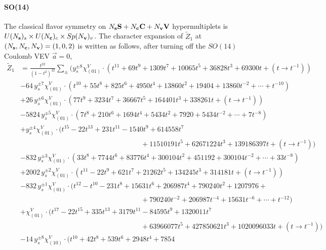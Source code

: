 \documentclass[letterpaper, 11pt]{article}
\newcommand{\nn}{\nonumber}
\begin{document}
{  \paragraph{SO(14)} The classical flavor symmetry  on $N_{\bf s} \mathbf{S}+N_{\bf c} \mathbf{C}+ N_{\bf v} \mathbf{V}$ hypermultiplets is $U(N_{\bf s})_s \times U(N_{\bf c})_c  \times Sp(N_{\bf v})_v$. The character expansion of  $\tilde{Z}_1$ at $(N_{\bf s},N_{\bf c}, N_{\bf v}) = (1,0,2)$ is written as follows, after turning off the $SO(14)$ Coulomb VEV $\vec{a} = 0$,
  \begin{align}
  \label{eq:so14-s1v2}
  \tilde{Z}_1&=\frac{t^{22}}{(1-t^2)^{22}}\sum_{\pm}\Big(y_s^{\pm8}\chi^V_{(01)}\cdot (t^{11}+69 t^9+1309 t^7+10065 t^5+36828 t^3+69300
  t+  (t\rightarrow t^{-1}) )\nn\\
  &-64\,y_s^{\pm7}\chi^V_{(01)}\cdot (t^{10}+55 t^8+825 t^6+4950 t^4+13860
  t^2+19404+13860t^{-2} + \cdots + t^{-10})\nn\\
  &+26\,y_s^{\pm6}\chi^V_{(01)}\cdot (77 t^9+3234 t^7+36667 t^5+164401 t^3+338261
  t+  (t\rightarrow t^{-1}))\nn\\
  &-5824\,y_s^{\pm5}\chi^V_{(01)}\cdot (7 t^8+210 t^6+1694 t^4+5434
  t^2+7920+ 5434t^{-2} + \cdots + 7t^{-8}) \nn\\
  &+y_s^{\pm4}\chi^V_{(01)}\cdot (t^{15}-22 t^{13}+231 t^{11}-1540 t^9+614558 t^7\nn\\
  &\qquad\qquad\qquad\qquad\qquad\qquad\qquad\qquad\quad +11510191 t^5+62671224 t^3+139186397t+  (t\rightarrow t^{-1}))\nn\\
  &-832\,y_s^{\pm3}\chi^V_{(01)}\cdot (33 t^8+7744 t^6+83776 t^4+300104
  t^2+451192+300104t^{-2} + \cdots + 33t^{-8})\nn\\
  &+2002\,y_s^{\pm2}\chi^V_{(01)}\cdot (t^{11}-22 t^9+621 t^7+21262 t^5+134245 t^3+314181t+  (t\rightarrow t^{-1}) )\nn\\
  &-832\,y_s^{\pm1}\chi^V_{(01)}\cdot (t^{12}-t^{10}-231 t^8+15631 t^6+206987 t^4+790240t^2+1207976+ \nn\\
  &\qquad\qquad\qquad\qquad\qquad\qquad\qquad\qquad\quad +790240t^{-2} +206987 t^{-4} +  15631 t^{-6} + \cdots + t^{-12}) \nn\\
  &+\chi^V_{(01)}\cdot (t^{17}-22 t^{15}+335 t^{13}+3179 t^{11}-84595 t^9+1320011 t^7\nn\\
  &\qquad\qquad\qquad\qquad\qquad\qquad\qquad\qquad\quad +63966077 t^5+427850621 t^3+1020096033t+  (t\rightarrow t^{-1}) ) \nn\\
  &-14\,y_s^{\pm8}\chi^V_{(10)}\cdot  (t^{10}+42 t^8+539 t^6+2948 t^4+7854

\end{align}}
\end{document}
